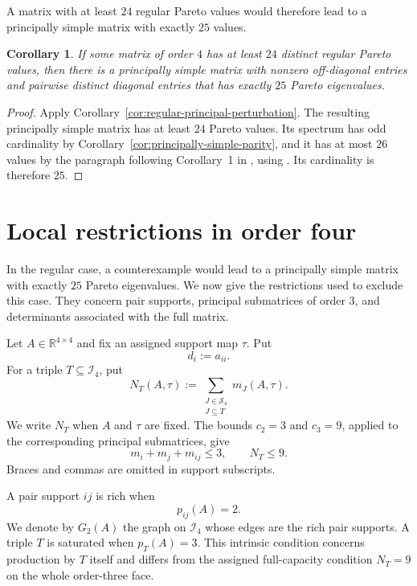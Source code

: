 \documentclass[11pt,a4paper]{article}
\newtheorem{corollary}[theorem]{Corollary}
\theoremstyle{definition}
\newcommand{\R}{\mathbb R}
\newcommand{\Ind}{\mathcal I}
\newcommand{\Supp}{\mathscr S}
\begin{document}
A matrix with at least $24$ regular Pareto values would therefore lead
to a principally simple matrix with exactly $25$ values.

\begin{corollary}
\label{cor:regular-to-25}
If some matrix of order $4$  has at least $24$ distinct regular Pareto
values, then there is a principally simple matrix with nonzero
off-diagonal entries and pairwise distinct diagonal entries that has
exactly $25$ Pareto eigenvalues.
\end{corollary}

\begin{proof}
Apply Corollary~\ref{cor:regular-principal-perturbation}. The resulting
principally simple matrix has at least $24$ Pareto values. Its spectrum
has odd cardinality by
Corollary~\ref{cor:principally-simple-parity}, and it has at most
$26$ values by the paragraph following Corollary~1 in
\cite[p.~8]{BaillonSeeger2021}, using
\cite[Lemma~5.1]{Seeger1999}. Its cardinality is therefore $25$.
\end{proof}

\section{Local restrictions in order four}
\label{sec:local-identities}

In the regular case, a counterexample would lead to a principally
simple matrix with exactly $25$ Pareto eigenvalues. We now give the
restrictions used to exclude this case. They concern pair supports,
principal submatrices of order $3$, and determinants associated with
the full matrix.

Let $A\in\R^{4\times4}$ and fix an assigned support map $\tau$. Put
$$
d_i:=a_{ii}.
$$
For a triple $T\subseteq\Ind_4$, put
$$
N_T(A,\tau)
:=
\sum_{\substack{J\in\Supp_4\\J\subseteq T}}m_J(A,\tau).
$$
We write $N_T$ when $A$ and $\tau$ are fixed. The bounds $c_2=3$ and
$c_3=9$, applied to the corresponding principal submatrices, give
$$
m_i+m_j+m_{ij}\leq3,
\qquad
N_T\leq9.
$$
Braces and commas are omitted in support subscripts.

A pair support $ij$ is rich when
$$
p_{ij}(A)=2.
$$
We denote by $G_2(A)$ the graph on $\Ind_4$ whose edges are the rich
pair supports. A triple $T$ is saturated when $p_T(A)=3$. This
intrinsic condition concerns production by $T$ itself and differs from
the assigned full-capacity condition $N_T=9$ on the whole
order-three face.
\end{document}
